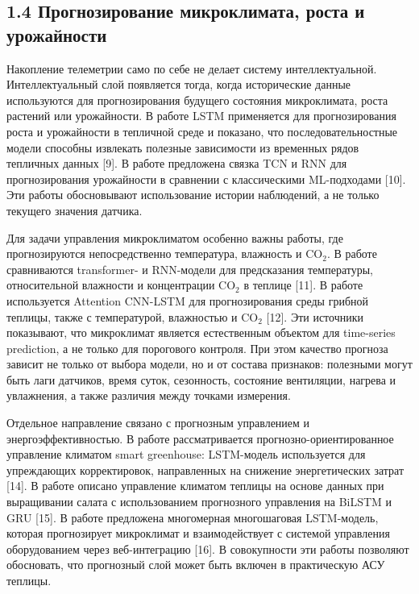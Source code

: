 \documentclass[a4paper,14pt]{extarticle}
\begin{document}
\hypertarget{ux43fux440ux43eux433ux43dux43eux437ux438ux440ux43eux432ux430ux43dux438ux435-ux43cux438ux43aux440ux43eux43aux43bux438ux43cux430ux442ux430-ux440ux43eux441ux442ux430-ux438-ux443ux440ux43eux436ux430ux439ux43dux43eux441ux442ux438}{%
\subsection{1.4 Прогнозирование микроклимата, роста и
урожайности}\label{ux43fux440ux43eux433ux43dux43eux437ux438ux440ux43eux432ux430ux43dux438ux435-ux43cux438ux43aux440ux43eux43aux43bux438ux43cux430ux442ux430-ux440ux43eux441ux442ux430-ux438-ux443ux440ux43eux436ux430ux439ux43dux43eux441ux442ux438}}

Накопление телеметрии само по себе не делает систему интеллектуальной.
Интеллектуальный слой появляется тогда, когда исторические данные
используются для прогнозирования будущего состояния микроклимата, роста
растений или урожайности. В работе LSTM применяется для прогнозирования
роста и урожайности в тепличной среде и показано, что
последовательностные модели способны извлекать полезные зависимости из
временных рядов тепличных данных {[}9{]}. В работе предложена связка TCN
и RNN для прогнозирования урожайности в сравнении с классическими
ML-подходами {[}10{]}. Эти работы обосновывают использование истории
наблюдений, а не только текущего значения датчика.

Для задачи управления микроклиматом особенно важны работы, где
прогнозируются непосредственно температура, влажность и CO\(_2\). В
работе сравниваются transformer- и RNN-модели для предсказания
температуры, относительной влажности и концентрации CO\(_2\) в теплице
{[}11{]}. В работе используется Attention CNN-LSTM для прогнозирования
среды грибной теплицы, также с температурой, влажностью и CO\(_2\)
{[}12{]}. Эти источники показывают, что микроклимат является
естественным объектом для time-series prediction, а не только для
порогового контроля. При этом качество прогноза зависит не только от
выбора модели, но и от состава признаков: полезными могут быть лаги
датчиков, время суток, сезонность, состояние вентиляции, нагрева и
увлажнения, а также различия между точками измерения.

Отдельное направление связано с прогнозным управлением и
энергоэффективностью. В работе рассматривается прогнозно-ориентированное
управление климатом smart greenhouse: LSTM-модель используется для
упреждающих корректировок, направленных на снижение энергетических
затрат {[}14{]}. В работе описано управление климатом теплицы на основе
данных при выращивании салата с использованием прогнозного управления на
BiLSTM и GRU {[}15{]}. В работе предложена многомерная многошаговая
LSTM-модель, которая прогнозирует микроклимат и взаимодействует с
системой управления оборудованием через веб-интеграцию {[}16{]}. В
совокупности эти работы позволяют обосновать, что прогнозный слой может
быть включен в практическую АСУ теплицы.
\end{document}
